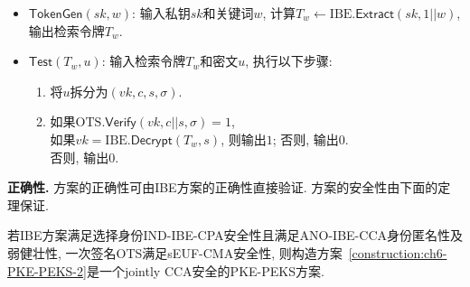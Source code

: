 \begin{construction}
\begin{itemize}
	\item $\mathsf{TokenGen}(sk, w)$: 输入私钥$sk$和关键词$w$, 计算$T_w \leftarrow \text{IBE}.\mathsf{Extract}(sk, 1||w)$, 输出检索令牌$T_w$.\vspace{0.5em}
			
	\item $\mathsf{Test}(T_w, u)$: 输入检索令牌$T_w$和密文$u$, 执行以下步骤:
		\begin{enumerate} \itemsep 1pt \parskip 0pt \parsep 0pt
			\item 将$u$拆分为$(vk, c, s, \sigma)$.
			\item 如果$\text{OTS}.\mathsf{Verify}(vk, c||s, \sigma) = 1$, \\
				\hspace*{2em}如果$vk = \text{IBE}.\mathsf{Decrypt}(T_w, s)$, 则输出$1$; 否则, 输出$0$.\\
			    否则, 输出$0$.
		\end{enumerate}
\end{itemize}
\end{construction}

\begin{trivlist}
\item \textbf{正确性.} 方案的正确性可由IBE方案的正确性直接验证. 方案的安全性由下面的定理保证.
\end{trivlist}


\begin{theorem}\label{theorem:ch6-PKE-PEKS-2}
若IBE方案满足选择身份IND-IBE-CPA安全性且满足ANO-IBE-CCA身份匿名性及弱健壮性, 一次签名OTS满足sEUF-CMA安全性, 则构造方案~\ref{construction:ch6-PKE-PEKS-2}是一个jointly CCA安全的PKE-PEKS方案.
\end{theorem}


